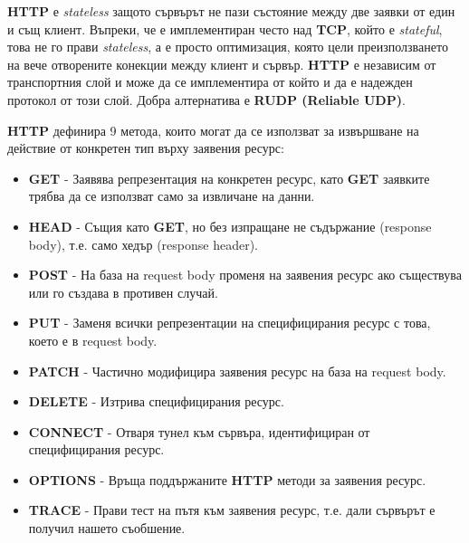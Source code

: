 \documentclass[fleqn,12pt]{article}
\begin{document}
\begin{flushleft}
\textbf{HTTP} е \textit{stateless} защото сървърът не пази състояние между две заявки от един и същ клиент.
Въпреки, че е имплементиран често над \textbf{TCP}, който е \textit{stateful}, това не го прави \textit{stateless}, а е просто оптимизация, която цели преизползването на вече отворените конекции между клиент и сървър.
\textbf{HTTP} е независим от транспортния слой и може да се имплементира от който и да е надежден протокол от този слой.
Добра алтернатива е \textbf{RUDP (Reliable UDP)}.

\textbf{HTTP} дефинира 9 метода, които могат да се използват за извършване на действие от конкретен тип върху заявения ресурс:
\begin{itemize}
    \item \textbf{GET} - Заявява репрезентация на конкретен ресурс, като \textbf{GET} заявките трябва да се използват само за извличане на данни.
    \item \textbf{HEAD} - Същия като \textbf{GET}, но без изпращане не съдържание (response body), т.е. само хедър (response header).
    \item \textbf{POST} - На база на request body променя на заявения ресурс ако съществува или го създава в противен случай.
    \item \textbf{PUT} - Заменя всички репрезентации на специфицирания ресурс с това, което е в request body.
    \item \textbf{PATCH} - Частично модифицира заявения ресурс на база на request body.
    \item \textbf{DELETE} - Изтрива специфицирания ресурс.
    \item \textbf{CONNECT} - Отваря тунел към сървъра, идентифициран от специфицирания ресурс.
    \item \textbf{OPTIONS} - Връща поддържаните \textbf{HTTP} методи за заявения ресурс.
    \item \textbf{TRACE} - Прави тест на пътя към заявения ресурс, т.е. дали сървърът е получил нашето съобшение.
\end{itemize}

\end{flushleft}
\end{document}
